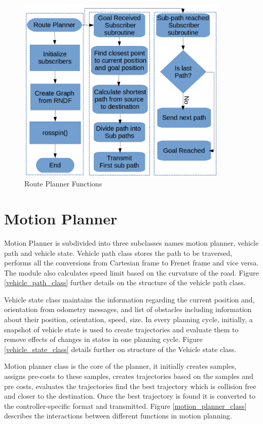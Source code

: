 \begin{figure}
	\centering
	\includegraphics[width=0.9\textwidth]{Images/implementation/route_planner.png}
	\caption{Route Planner Functions}
	\label{route_planner_func}
\end{figure}

\section{Motion Planner}
Motion Planner is subdivided into three subclasses names motion planner, vehicle path and vehicle state. Vehicle path class stores the path to be traversed, performs all the conversions from Cartesian frame to Frenet frame and vice versa. The module also calculates speed limit based on the curvature of the road. Figure \ref{vehicle_path_class} further details on the structure of the vehicle path class. 

Vehicle state class maintains the information regarding the current position and, orientation from odometry messages, and list of obstacles including information about their position, orientation, speed, size. In every planning cycle, initially, a snapshot of vehicle state is used to create trajectories and evaluate them to remove effects of changes in states in one planning cycle. Figure \ref{vehicle_state_class} details further on structure of the Vehicle state class. 


Motion planner class is the core of the planner, it initially creates samples, assigns pre-costs to these samples, creates trajectories based on the samples and pre costs, evaluates the trajectories find the best trajectory which is collision free and closer to the destination. Once the best trajectory is found it is converted to the controller-specific format and transmitted. Figure \ref{motion_planner_class} describes the interactions between different functions in motion planning.


